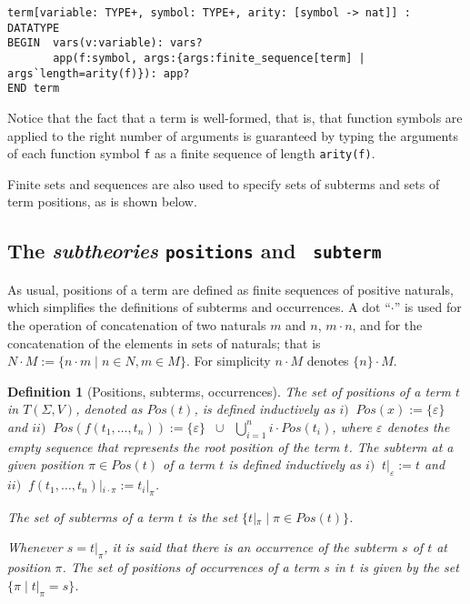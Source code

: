 \documentclass[submission,copyright,creativecommons]{eptcs}
\newtheorem{definition}{Definition}
\begin{document}
{\small
\begin{verbatim}
term[variable: TYPE+, symbol: TYPE+, arity: [symbol -> nat]] : DATATYPE
BEGIN  vars(v:variable): vars?
       app(f:symbol, args:{args:finite_sequence[term] | args`length=arity(f)}): app?
END term
\end{verbatim}}

  Notice that the fact that a term is well-formed, that is, that
  function symbols are applied to the right number of arguments is
  guaranteed by typing the arguments of each function symbol {\tt f}
  as a finite sequence of length {\tt arity(f)}.

  Finite sets and sequences are also used to specify sets of subterms
  and sets of term positions, as is shown below.


  \subsection{The \emph{subtheories} {\tt positions} and {\tt
      subterm}}

  As usual, positions of a term are defined as finite sequences of
  positive naturals, which simplifies the definitions of subterms and
  occurrences.  A dot ``$\cdot$'' is used for the operation of
  concatenation of two naturals $m$ and $n$, $m\cdot n$, and for the
  concatenation of the elements in sets of naturals; that is $N\cdot M
  :=\{n\cdot m \; |\; n\in N, m\in M\}$. For simplicity $n\cdot M$
  denotes $\{n\}\cdot M$.

\begin{definition}[Positions, subterms, occurrences]
  The set of positions of a term $t$ in $T(\Sigma,V)$, denoted as
  $Pos(t)$, is defined inductively as $i)\;\; Pos(x) :=
  \{\varepsilon\}$ and $ii)\;\; Pos(f(t_1,\ldots, t_n)) :=
  \{\varepsilon\}\;\;\cup\;\; \bigcup_{i=1}^{n} i\cdot Pos(t_i)$,
  where $\varepsilon$ denotes the empty sequence that represents the
  \emph{root position} of the term $t$.
 The subterm at a given position $\pi\in Pos(t)$ of a term $t$ is
  defined inductively as $i)\;\; t|_\varepsilon := t$ and $ii)\;\;
  f(t_1,\ldots, t_n)|_{i\cdot \pi} := t_i|_\pi$.

  The set of subterms of a term $t$ is the set $\{t|_\pi \; |\; \pi\in
  Pos(t)\}$.

  Whenever $s=t|_\pi$, it is said that there is an occurrence of the
  subterm $s$ of $t$ at position $\pi$. The set of positions of
  occurrences of a term $s$ in $t$ is given by the set $\{ \pi \; |\;
  t|_\pi = s\}$.
\end{definition}
\end{document}
